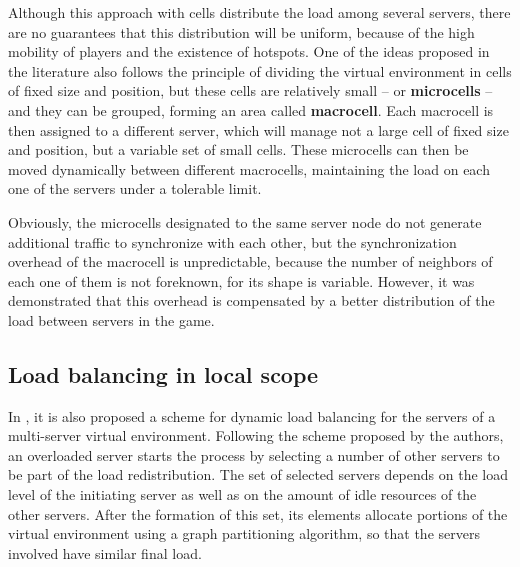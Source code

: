 Although this approach with cells distribute the load among several servers, there are no guarantees that this distribution will be uniform, because of the high mobility of players and the existence of hotspots. One of the ideas proposed in the literature \cite{devleeschauwer2005dma} also follows the principle of dividing the virtual environment in cells of fixed size and position, but these cells are relatively small -- or \textbf{microcells} -- and they can be grouped, forming an area called \textbf{macrocell}. Each macrocell is then assigned to a different server, which will manage not a large cell of fixed size and position, but a variable set of small cells. These microcells can then be moved dynamically between different macrocells, maintaining the load on each one of the servers under a tolerable limit.

Obviously, the microcells designated to the same server node do not generate additional traffic to synchronize with each other, but the synchronization overhead of the macrocell is unpredictable, because the number of neighbors of each one of them is not foreknown, for its shape is variable. However, it was demonstrated \cite{devleeschauwer2005dma} that this overhead is compensated by a better distribution of the load between servers in the game. %


\subsection{Load balancing in local scope}
\label{sec:local}
	
In \cite{lee2003sdl}, it is also proposed a scheme for dynamic load balancing for the servers of a multi-server virtual environment. Following the scheme proposed by the authors, an overloaded server starts the process by selecting a number of other servers to be part of the load redistribution. The set of selected servers depends on the load level of the initiating server as well as on the amount of idle resources of the other servers. After the formation of this set, its elements allocate portions of the virtual environment using a graph partitioning algorithm, so that the servers involved have similar final load.

